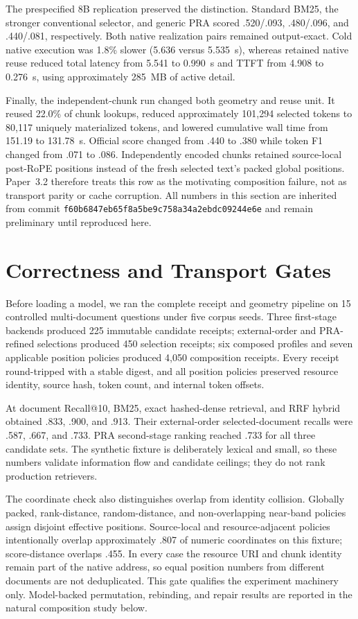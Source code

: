 \documentclass[11pt]{article}
\begin{document}
The prespecified 8B replication preserved the distinction. Standard BM25,
the stronger conventional selector, and generic PRA scored .520/.093,
.480/.096, and .440/.081, respectively. Both native realization pairs remained
output-exact. Cold native execution was 1.8\% slower (5.636 versus 5.535~s),
whereas retained native reuse reduced total latency from 5.541 to 0.990~s and
TTFT from 4.908 to 0.276~s, using approximately 285~MB of active detail.

Finally, the independent-chunk run changed both geometry and reuse unit. It
reused 22.0\% of chunk lookups, reduced approximately 101,294 selected tokens
to 80,117 uniquely materialized tokens, and lowered cumulative wall time from
151.19 to 131.78~s. Official score changed from .440 to .380 while token F1
changed from .071 to .086. Independently encoded chunks retained source-local
post-RoPE positions instead of the fresh selected text's packed global
positions. Paper~3.2 therefore treats this row as the motivating composition
failure, not as transport parity or cache corruption. All numbers in this
section are inherited from commit
\texttt{f60b6847eb65f8a5be9c758a34a2ebdc09244e6e} and remain preliminary until
reproduced here.

\section{Correctness and Transport Gates}
\label{sec:mechanism-gate}

Before loading a model, we ran the complete receipt and geometry pipeline on
15 controlled multi-document questions under five corpus seeds. Three
first-stage backends produced 225 immutable candidate receipts; external-order
and PRA-refined selections produced 450 selection receipts; six composed
profiles and seven applicable position policies produced 4,050 composition
receipts. Every receipt round-tripped with a stable digest, and all position
policies preserved resource identity, source hash, token count, and internal
token offsets.

At document Recall@10, BM25, exact hashed-dense retrieval, and RRF hybrid
obtained .833, .900, and .913. Their external-order selected-document recalls
were .587, .667, and .733. PRA second-stage ranking reached .733 for all three
candidate sets. The synthetic fixture is deliberately lexical and small, so
these numbers validate information flow and candidate ceilings; they do not
rank production retrievers.

The coordinate check also distinguishes overlap from identity collision.
Globally packed, rank-distance, random-distance, and non-overlapping near-band
policies assign disjoint effective positions. Source-local and
resource-adjacent policies intentionally overlap approximately .807 of numeric
coordinates on this fixture; score-distance overlaps .455. In every case the
resource URI and chunk identity remain part of the native address, so equal
position numbers from different documents are not deduplicated. This gate
qualifies the experiment machinery only. Model-backed permutation, rebinding,
and repair results are reported in the natural composition study below.
\end{document}
